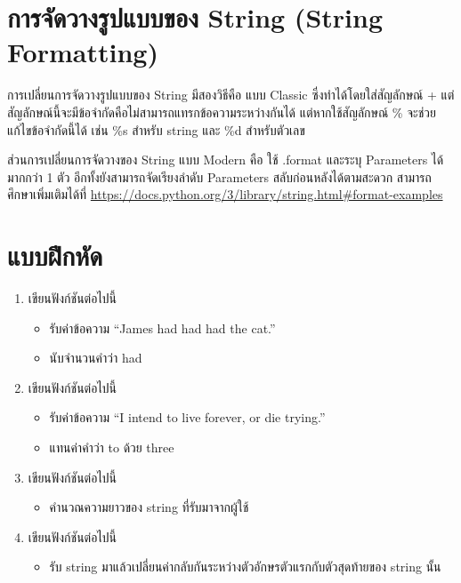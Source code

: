 \section{การจัดวางรูปแบบของ String (String Formatting)}

การเปลี่ยนการจัดวางรูปแบบของ String มีสองวิธีคือ แบบ Classic ซึ่งทำได้โดยใส่สัญลักษณ์ + แต่สัญลักษณ์นี้จะมีข้อจำกัดคือไม่สามารถแทรกข้อความระหว่างกันได้ แต่หากใช้สัญลักษณ์ \% จะช่วยแก้ไขข้อจำกัดนี้ได้ เช่น \%s สำหรับ string และ \%d สำหรับตัวเลข 

ส่วนการเปลี่ยนการจัดวางของ String แบบ Modern คือ ใช้ .format และระบุ Parameters ได้มากกว่า 1 ตัว อีกทั้งยังสามารถจัดเรียงลำดับ Parameters สลับก่อนหลังได้ตามสะดวก สามารถศึกษาเพิ่มเติมได้ที่ \url{https://docs.python.org/3/library/string.html\#format-examples}

\section{แบบฝึกหัด}
\begin{enumerate} 
\item 	เขียนฟังก์ชันต่อไปนี้
\begin{itemize}
\item 	รับค่าข้อความ “James had had had the cat.”
\item 	นับจำนวนคำว่า had
\end{itemize}
\item 	เขียนฟังก์ชันต่อไปนี้
\begin{itemize}
\item 	รับค่าข้อความ “I intend to live forever, or die trying.”
\item 	แทนค่าคำว่า to ด้วย three
\end{itemize}
\item 	เขียนฟังก์ชันต่อไปนี้
\begin{itemize}
\item 	คำนวณความยาวของ string ที่รับมาจากผู้ใช้
\end{itemize}
\item 	เขียนฟังก์ชันต่อไปนี้
\begin{itemize}
\item 	รับ string มาแล้วเปลี่ยนค่ากลับกันระหว่างตัวอักษรตัวแรกกับตัวสุดท้ายของ string นั้น
\end{itemize}
\end{enumerate}


